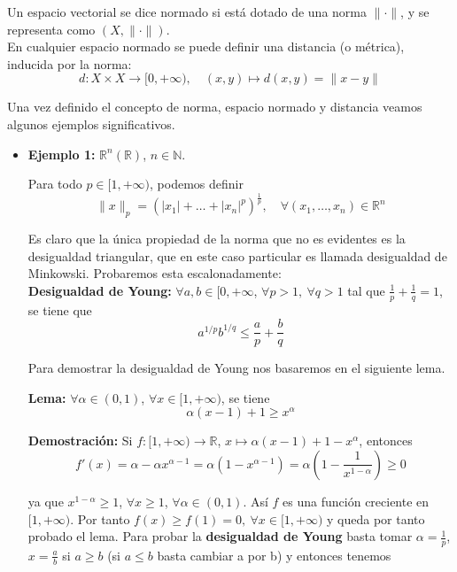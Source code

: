 \documentclass{article}
\begin{document}
Un espacio vectorial se dice normado si está dotado de una norma $\|\cdot\|$, y se representa como $(X,\|\cdot\|)$.\\

En cualquier espacio normado se puede definir una distancia (o métrica), inducida por la norma:
\begin{equation}
d:X\times X\rightarrow [0,+\infty),\quad (x,y)\mapsto d(x,y)=\|x-y\|
\end{equation}

Una vez definido el concepto de norma, espacio normado y distancia veamos algunos ejemplos significativos.

\begin{itemize}
\item \textbf{Ejemplo 1:} $\mathbb{R}^n(\mathbb{R})$, $n\in \mathbb{N}$.

Para todo $p\in [1,+\infty)$, podemos definir
\begin{equation*}
\|x\|_p=(|x_1|+\ldots+|x_n|^p)^\frac{1}{p},\quad \forall (x_1,\ldots,x_n)\in \mathbb{R}^n
\end{equation*}

Es claro que la única propiedad de la norma que no es evidentes es la desigualdad triangular, que en este caso particular es llamada desigualdad de Minkowski. Probaremos esta escalonadamente:\\

\textbf{Desigualdad de Young:} $\forall a,b\in [0,+\infty$, $\forall p>1,\:\forall q>1$ tal que $\frac{1}{p}+\frac{1}{q}=1$, se tiene que
\begin{equation*}
a^{1/p}b^{1/q}\leq \frac{a}{p}+\frac{b}{q}
\end{equation*}

Para demostrar la desigualdad de Young nos basaremos en el siguiente lema.

\textbf{Lema:} $\forall \alpha\in (0,1)$, $\forall x\in [1,+\infty)$, se tiene
\begin{equation*}
\alpha(x-1)+1\geq x^\alpha
\end{equation*}

\textbf{Demostración:} Si $f:[1,+\infty)\rightarrow \mathbb{R}$, $x\mapsto \alpha(x-1)+1-x^\alpha$, entonces
\begin{equation*}
f'(x)=\alpha-\alpha x^{\alpha-1}=\alpha(1-x^{\alpha-1})=\alpha\left(1-\frac{1}{x^{1-\alpha}}\right)\geq 0
\end{equation*}

ya que $x^{1-\alpha}\geq 1$, $\forall x\geq 1$, $\forall \alpha\in (0,1)$. Así $f$ es una función creciente en $[1,+\infty)$. Por tanto $f(x)\geq f(1)=0,\:\forall x\in [1,+\infty)$ y queda por tanto probado el lema. Para probar la \textbf{desigualdad de Young} basta tomar $\alpha=\frac{1}{p}$, $x=\frac{a}{b}$ si $a\geq b$ (si $a\leq b$ basta cambiar a por b) y entonces tenemos


\end{itemize}
\end{document}

